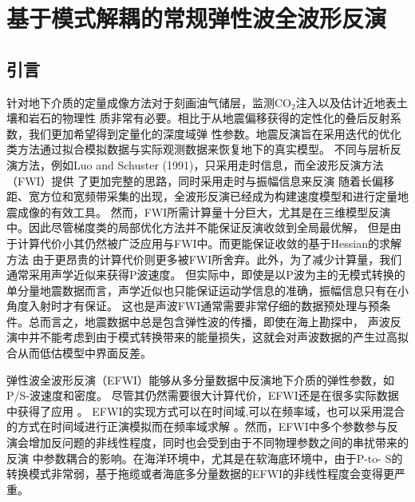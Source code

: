 



\chapter{基于模式解耦的常规弹性波全波形反演}
\label{cha:MD-EFWI}
\section{引言}
针对地下介质的定量成像方法对于刻画油气储层，监测CO$_2$注入以及估计近地表土壤和岩石的物理性
质非常有必要。相比于从地震偏移获得的定性化的叠后反射系数，我们更加希望得到定量化的深度域弹
性参数。地震反演旨在采用迭代的优化类方法通过拟合模拟数据与实际观测数据来恢复地下的真实模型。
不同与层析反演方法，例如Luo and Schuster (1991)\citep{luo1991}，只采用走时信息，而全波形反演方法（FWI）提供
了更加完整的思路，同时采用走时与振幅信息来反演\cite[]{tarantola:1986}
随着长偏移距、宽方位和宽频带采集的出现，全波形反演已经成为构建速度模型和进行定量地震成像的有效工具\cite{virieux2009overview}。
然而，FWI所需计算量十分巨大，尤其是在三维模型反演中。因此尽管梯度类的局部优化方法并不能保证反演收敛到全局最优解，
但是由于计算代价小其仍然被广泛应用与FWI中。而更能保证收敛的基于Hessian的求解方法\cite{mora:1987,crase1990robust}
由于更昂贵的计算代价则更多被FWI所舍弃。此外，为了减少计算量，我们通常采用声学近似来获得P波速度\cite{ravaut2004multiscale,operto2006crustal}。
但实际中，即使是以P波为主的无模式转换的单分量地震数据而言，声学近似也只能保证运动学信息的准确，振幅信息只有在小角度入射时才有保证。
这也是声波FWI通常需要非常仔细的数据预处理与预条件。总而言之，地震数据中总是包含弹性波的传播，即使在海上勘探中，
声波反演中并不能考虑到由于模式转换带来的能量损失，这就会对声波数据的产生过高拟合从而低估模型中界面反差。

弹性波全波形反演（EFWI）\cite{tarantola:1986}能够从多分量数据中反演地下介质的弹性参数，如P/S-波速度和密度。
尽管其仍然需要很大计算代价，EFWI还是在很多实际数据中获得了应用
\cite{crase1992nonlinear,djikpesse.tarantola:1999,sears:2008,sears:2010,prieux:2013a,prieux:2013b,vigh:2014}。
EFWI的实现方式可以在时间域\cite{shipp:2002},可以在频率域\cite{brossier2009}，也可以采用混合的方式在时间域进行正演模拟而在频率域求解
\cite{nihei.li:2007,sirgue:2008}。然而，EFWI中多个参数参与反演会增加反问题的非线性程度，同时也会受到由于不同物理参数之间的串扰带来的反演
中参数耦合的影响\cite{forgues.lambare:1997}。在海洋环境中，尤其是在软海底环境中，由于P-to-
S的转换模式非常弱，基于拖缆或者海底多分量数据的EFWI的非线性程度会变得更严重\cite{sears:2008}。

